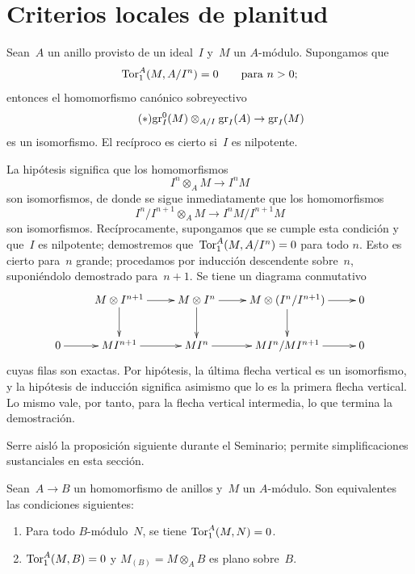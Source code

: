 
\section{Criterios locales de planitud}
\label{IV.5}

\begin{proposition}
\label{IV.5.1}
Sean~$A$ un anillo provisto de un ideal~$I$ y~$M$ un $A$-módulo.
Supongamos que
$$
\operatorname{Tor}_1^A(M,A/I^n)=0 \qquad \text{para $n>0$};
$$
entonces el homomorfismo canónico sobreyectivo
\begin{equation*}
\label{eq:IV.5.1.*}
\tag{$*$} {\operatorname{gr}_I^0(M)\otimes_{A/I}\operatorname{gr}_I(A)\to\operatorname{gr}_I(M)}
\end{equation*}
es un isomorfismo. El recíproco es cierto si~$I$ es nilpotente.
\end{proposition}

La hipótesis significa que los homomorfismos
$$
I^n\otimes_A M\to I^nM
$$
son isomorfismos, de donde se sigue inmediatamente que los homomorfismos
$$
I^n/I^{n+1}\otimes_A M\to I^nM/I^{n+1}M
$$
son isomorfismos. Recíprocamente, supongamos que se cumple esta condición
y que~$I$ es nilpotente; demostremos que~$\operatorname{Tor}_1^A(M,A/I^n)=0$ para todo
$n$. Esto es cierto para~$n$ grande; procedamos por inducción descendente
sobre~$n$, suponiéndolo demostrado para~$n+1$. Se tiene un diagrama
conmutativo
$$
\xymatrix{ & M\otimes I^{n+1}\ar[r]\ar[d] & M\otimes I^n\ar[r]
\ar[d] & M\otimes(I^n/I^{n+1})\ar[r]\ar[d] & 0 \\ 0\ar[r] &
MI^{n+1}\ar[r] & MI^n\ar[r] & MI^n/MI^{n+1}\ar[r] & 0 }
$$
cuyas filas son exactas.
Por hipótesis, la última flecha vertical es un isomorfismo, y la hipótesis
de inducción significa asimismo que lo es la primera flecha vertical. Lo
mismo vale, por tanto, para la flecha vertical intermedia, lo que termina
la demostración.

Serre aisló la proposición siguiente durante el Seminario; permite
simplificaciones sustanciales en esta sección.
\begin{proposition}
\label{IV.5.2}
Sean~$A\to B$ un homomorfismo de anillos y~$M$ un $A$-módulo. Son
equivalentes las condiciones siguientes:
\begin{enumerate}
\item[(i)] Para todo $B$-módulo~$N$, se tiene $\operatorname{Tor}_1^A(M,N)=0$.
\item[(ii)] $\operatorname{Tor}_1^A(M,B)=0$ y $M_{(B)}=M\otimes_A B$ es plano
sobre~$B$.
\end{enumerate}
\end{proposition}

